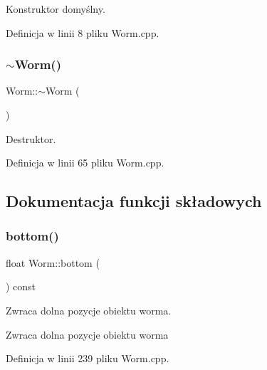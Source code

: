 Konstruktor domyślny. 



Definicja w linii 8 pliku Worm.\+cpp.

\mbox{\label{class_worm_ade7672966c551bb91663ed03e06f297f}} 
\subsubsection{\texorpdfstring{$\sim$\+Worm()}{~Worm()}}
{\footnotesize\ttfamily Worm\+::$\sim$\+Worm (\begin{DoxyParamCaption}{ }\end{DoxyParamCaption})\hspace{0.3cm}{\ttfamily [virtual]}}



Destruktor. 



Definicja w linii 65 pliku Worm.\+cpp.



\subsection{Dokumentacja funkcji składowych}
\mbox{\label{class_worm_a68061fb5be175ab42739a7c157d7073d}} 
\subsubsection{\texorpdfstring{bottom()}{bottom()}}
{\footnotesize\ttfamily float Worm\+::bottom (\begin{DoxyParamCaption}{ }\end{DoxyParamCaption}) const}



Zwraca dolna pozycje obiektu worma. 

\begin{DoxyReturn}{Zwraca}
dolna pozycje obiektu worma 
\end{DoxyReturn}


Definicja w linii 239 pliku Worm.\+cpp.

\mbox{\label{class_worm_a61589ff1104deb3cbf1cb6978e7f95f4}} 
